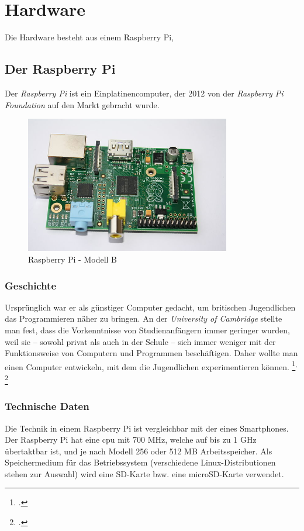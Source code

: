 \chapter{Hardware}

Die Hardware besteht aus einem Raspberry Pi, 
\section{Der Raspberry Pi}
Der \textit{Raspberry Pi} ist ein Einplatinencomputer, der 2012 von der \textit{Raspberry Pi Foundation} auf den Markt gebracht wurde.

\begin{figure}[h]
  \centering
     \includegraphics[width=0.8\textwidth]{figures/raspberry.jpg}
 \caption[Raspberry Pi - Modell B]{Raspberry Pi - Modell B\footnotemark}
  \label{fig:raspberry}
\end{figure}

\subsection{Geschichte}
Ursprünglich war er als günstiger Computer gedacht, um britischen Jugendlichen das Programmieren näher zu bringen. An der \textit{University of Cambridge} stellte man fest, dass die Vorkenntnisse von Studienanfängern immer geringer wurden, weil sie -- sowohl privat als auch in der Schule -- sich immer weniger mit der Funktionsweise von Computern und Programmen beschäftigen. Daher wollte man einen Computer entwickeln, mit dem die Jugendlichen experimentieren können.
\footcite{aboutraspberry}$^,$
\footcite[Geschichte]{wiki:raspberry}

\subsection{Technische Daten}
Die Technik in einem Raspberry Pi ist vergleichbar mit der eines Smartphones. Der Raspberry Pi hat eine \acrshort{cpu} mit 700 MHz, welche auf bis zu 1 GHz übertaktbar ist, und je nach Modell 256 oder 512 MB Arbeitsspeicher. Als Speichermedium für das Betriebssystem (verschiedene Linux-Distributionen stehen zur Auswahl) wird eine SD-Karte bzw. eine microSD-Karte verwendet.

